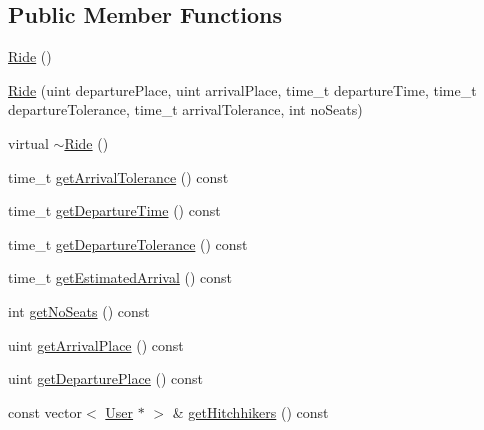 \subsection*{Public Member Functions}
\begin{DoxyCompactItemize}
\item 
\hyperlink{class_ride_aef9cd8f2760f8e0b46eb268e69b007b9}{Ride} ()
\item 
\hyperlink{class_ride_a7642ec84a4f8522c58179962b142b276}{Ride} (uint departure\+Place, uint arrival\+Place, time\+\_\+t departure\+Time, time\+\_\+t departure\+Tolerance, time\+\_\+t arrival\+Tolerance, int no\+Seats)
\item 
virtual \hyperlink{class_ride_a51b5edd7f67bf27f5225d7e2c211c34d}{$\sim$\+Ride} ()
\item 
time\+\_\+t \hyperlink{class_ride_a7e031c140104824a87bc3664354a8d8b}{get\+Arrival\+Tolerance} () const 
\item 
time\+\_\+t \hyperlink{class_ride_a15b59e580fc86bba03302c1b14c0e733}{get\+Departure\+Time} () const 
\item 
time\+\_\+t \hyperlink{class_ride_a09d280e7b7be35d8c1957316b1fdfa53}{get\+Departure\+Tolerance} () const 
\item 
time\+\_\+t \hyperlink{class_ride_a498db4e46f6520b747a18156855ecd27}{get\+Estimated\+Arrival} () const 
\item 
int \hyperlink{class_ride_ac6ce2ae3098bf408b70ca71ecdfa1278}{get\+No\+Seats} () const 
\item 
uint \hyperlink{class_ride_a50e27ef44b2bb35fb5da873f89fc1990}{get\+Arrival\+Place} () const 
\item 
uint \hyperlink{class_ride_af49465a0f4c2f9eb896f8c102b1d5c1d}{get\+Departure\+Place} () const 
\item 
const vector$<$ \hyperlink{class_user}{User} $\ast$ $>$ \& \hyperlink{class_ride_a0b7b285313e4f284a96b98b1565350bd}{get\+Hitchhikers} () const 
\end{DoxyCompactItemize}
